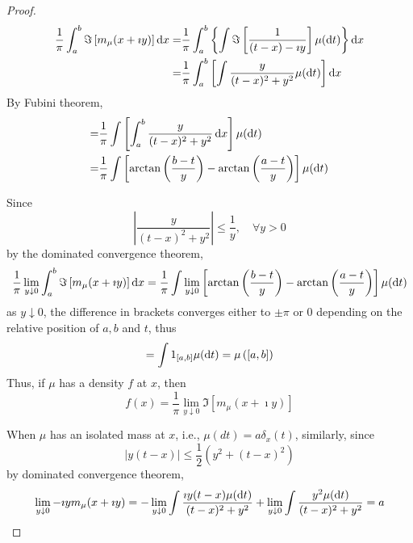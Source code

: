 \begin{proof}
	\begin{equation*}
		\begin{aligned}
			\frac{1}{\pi}\int_{a}^{b}\Im\left[m_{\mu}(x+\imath y)\right]\mathop{}\!\mathrm{d} x= & \frac{1}{\pi}\int_{a}^{b}\left\{\int\Im\left[\frac{1}{(t-x)-\imath y}\right]\mu(\mathop{}\!\mathrm{d} t)\right\}\mathop{}\!\mathrm{d} x \\
			=                                                                   & \frac{1}{\pi}\int_{a}^{b}\left[\int\frac{y}{(t-x)^{2}+y^{2}}\mu(\mathop{}\!\mathrm{d} t)\right]\mathop{}\!\mathrm{d} x
		\end{aligned}
	\end{equation*}
	By Fubini theorem,
	\begin{equation*}
		\begin{aligned}
			= & \frac{1}{\pi}\int\left[\int_{a}^{b}\frac{y}{(t-x)^{2}+y^{2}}\mathop{}\!\mathrm{d} x\right]\mu(\mathop{}\!\mathrm{d} t)                         \\
			= & \frac{1}{\pi}\int\left[\arctan\left(\frac{b-t}{y}\right)-\arctan\left(\frac{a-t}{y}\right)\right]\mu(\mathop{}\!\mathrm{d} t)
		\end{aligned}
	\end{equation*}

	Since
	\begin{equation*}
		\left|\frac{y}{(t-x)^{2}+y^{2}}\right|\leq\frac{1}{y},\quad\forall y>0
	\end{equation*}
	by the dominated convergence theorem,
	\begin{equation*}
		\frac{1}{\pi}\lim_{y\downarrow 0}\int_{a}^{b}\Im\left[m_{\mu}(x+\imath y)\right]\mathop{}\!\mathrm{d} x=\frac{1}{\pi}\int\lim_{y\downarrow 0}\left[\arctan\left(\frac{b-t}{y}\right)-\arctan\left(\frac{a-t}{y}\right)\right]\mu(\mathop{}\!\mathrm{d} t)
	\end{equation*}
	as \(y\downarrow 0\), the difference in brackets converges either to \(\pm \pi\) or 0 depending on the relative position of \(a,b\) and \(t\), thus
	\begin{equation*}
		=\int\mathrm{1}_{[a,b]}\mu(\mathop{}\!\mathrm{d} t)=\mu\left([a,b]\right)
	\end{equation*}
	Thus, if \(\mu\) has a density \(f\) at \(x\), then
	\begin{equation*}
		f(x)=\frac{1}{\pi}\lim_{y\downarrow 0}\Im\left[m_{\mu}(x+\imath y)\right]
	\end{equation*}

	When \(\mu\) has an isolated mass at \(x\), i.e., \(\mu(d t)=a \delta_{x}(t)\), similarly, since
	\begin{equation*}
		|y(t-x)|\leq\frac{1}{2}\left(y^{2}+(t-x)^{2}\right)
	\end{equation*}
	by dominated convergence theorem,
	\begin{equation*}
		\lim_{y\downarrow 0}-\imath ym_{\mu}(x+\imath y)=-\lim_{y\downarrow 0}\int\frac{\imath y(t-x)\mu(\mathop{}\!\mathrm{d} t)}{(t-x)^{2}+y^{2}}+\lim_{y\downarrow 0}\int\frac{y^{2}\mu(\mathop{}\!\mathrm{d} t)}{(t-x)^{2}+y^{2}}=a
	\end{equation*}
\end{proof}

